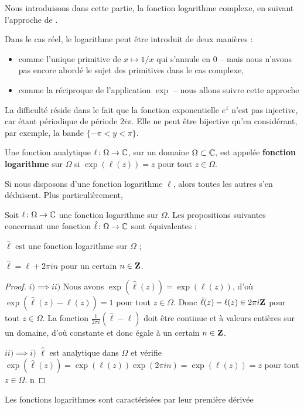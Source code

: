 Nous introduisons dans cette partie, la fonction logarithme complexe, en suivant l'approche de \cite{remmert1991theory}. 

Dans le cas réel, le logarithme peut être introduit de deux manières : 
\begin{itemize} 
\item comme l'unique primitive de $x \mapsto 1/x$ qui s'annule en 0 -- mais nous n'avons pas encore abordé le sujet des primitives dans le cas complexe, 
\item comme la réciproque de l'application $\exp$ -- nous allons suivre cette approche 
\end{itemize} 

La difficulté réside dans le fait que la fonction exponentielle $e^z$ n'est pas injective, car étant périodique de période $2 i \pi$. Elle ne peut être bijective qu'en considérant, par exemple, la bande $\{ -\pi < y <\pi\}$. 

\begin{fdefn}
Une fonction analytique $\ell \colon  \Omega \to \mathbb{C}$, sur un domaine $\Omega \subset \mathbb{C}$, est appelée \textbf{fonction logarithme} sur $\Omega$ si $\exp(\ell( z)) = z$ pour tout $z \in \Omega$. 
\end{fdefn}
Si nous disposons d'une fonction logarithme $\ell$, alors toutes les autres s'en déduisent. Plus particulièrement,
\begin{prop}
Soit $\ell \colon \Omega \to \mathbb{C}$ une fonction logarithme sur $\Omega$. Les propositions suivantes concernant une fonction $\hat{\ell} \colon \Omega \to \mathbb{C}$ sont équivalentes :
\begin{MYenumerate}
\item $\hat{\ell}$ est une fonction logarithme sur $\Omega$ ;
\item $\hat{\ell} = \ell + 2 \pi i n$ pour un certain $n \in {\mathbf Z}$.
\end{MYenumerate}
\end{prop}

\begin{proof}
$i)\implies ii)$ Nous avons $\exp(\hat{\ell}(z))=\exp(\ell (z))$, d'où $\exp (\hat{\ell}(z)-\ell(z))=1$ pour tout $z \in \Omega$. Donc $\hat{\ell}(z)-\ell(z) \in 2 \pi i {\mathbf Z}$ pour tout $z \in \Omega$. La fonction $\frac{1}{2 \pi i}(\hat{\ell} -\ell)$ doit être continue et à valeurs entières sur un domaine, d'où constante et donc égale à un certain $n \in {\mathbf Z}$.

$ii) \implies i)$ $\hat{\ell}$ est analytique dans $\Omega$ et vérifie $\exp(\hat{\ell}(z))=\exp(\ell(z)) \exp(2 \pi i n)=\exp (\ell(z))=z$
pour tout $z \in \Omega$. n 
\end{proof}
Les fonctions logarithmes sont caractérisées par leur première dérivée

